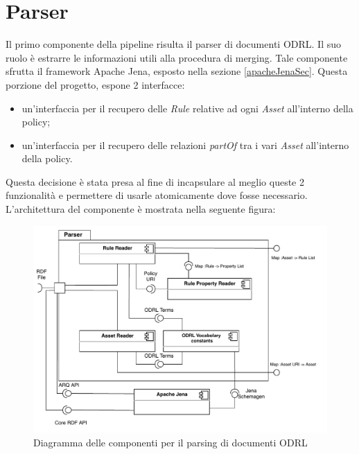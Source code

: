 \documentclass[12pt,a4paper,twoside]{book}
\begin{document}
\section{Parser}\label{parsingSection}
Il primo componente della pipeline risulta il parser di documenti ODRL. Il suo ruolo è estrarre le informazioni utili alla procedura di merging. Tale componente sfrutta il framework Apache Jena, esposto nella sezione \ref{apacheJenaSec}. Questa porzione del progetto, espone 2 interfacce:
\begin{itemize}
\item un'interfaccia per il recupero delle \textit{Rule} relative ad ogni \textit{Asset} all'interno della policy;
\item un'interfaccia per il recupero delle relazioni \textit{partOf} tra i vari \textit{Asset} all'interno della policy.
\end{itemize}
Questa decisione è stata presa al fine di incapsulare al meglio queste 2 funzionalità e permettere di usarle atomicamente dove fosse necessario. L'architettura del componente è mostrata nella seguente figura:
\begin{figure}[H]
\centering
\includegraphics[scale=.80]{../immagini/parserDiagram.pdf}
\caption{Diagramma delle componenti per il parsing di documenti ODRL}
\label{parserUML}
\end{figure}
\end{document}

